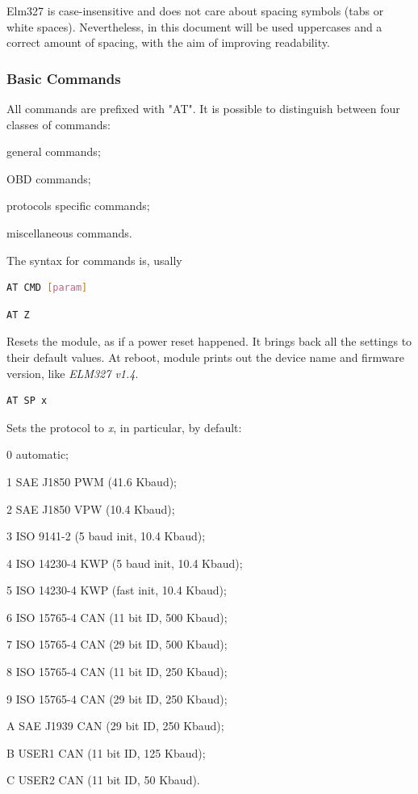 \documentclass[twoside]{article}
\begin{document}
\begin{multicols}{2}
Elm327 is case-insensitive and does not care about spacing symbols (tabs or white spaces).
Nevertheless, in this document will be used uppercases and a correct amount of spacing, with the aim of improving readability.

\subsubsection{Basic Commands}

All commands are prefixed with "AT". It is possible to distinguish between four classes of commands:
\begin{compactitem}
  \item general commands;
  \item OBD commands;
  \item protocols specific commands;
  \item miscellaneous commands.
\end{compactitem}

The syntax for commands is, usally
\begin{lstlisting}[language=bash]
AT CMD [param]
\end{lstlisting}

\begin{lstlisting}[language=bash]
AT Z
\end{lstlisting}

Resets the module, as if a power reset happened.
It brings back all the settings to their default values.
At reboot, module prints out the device name and firmware version, like \emph{ELM327 v1.4}.

\begin{lstlisting}[language=bash]
AT SP x
\end{lstlisting}

Sets the protocol to \emph{x}, in particular, by default:
\begin{compactitem}
  \item 0 automatic;
  \item 1 SAE J1850 PWM (41.6 Kbaud);
  \item 2 SAE J1850 VPW (10.4 Kbaud);
  \item 3 ISO 9141-2 (5 baud init, 10.4 Kbaud);
  \item 4 ISO 14230-4 KWP (5 baud init, 10.4 Kbaud);
  \item 5 ISO 14230-4 KWP (fast init, 10.4 Kbaud);
  \item 6 ISO 15765-4 CAN (11 bit ID, 500 Kbaud);
  \item 7 ISO 15765-4 CAN (29 bit ID, 500 Kbaud);
  \item 8 ISO 15765-4 CAN (11 bit ID, 250 Kbaud);
  \item 9 ISO 15765-4 CAN (29 bit ID, 250 Kbaud);
  \item A SAE J1939 CAN (29 bit ID, 250 Kbaud);
  \item B USER1 CAN (11 bit ID, 125 Kbaud);
  \item C USER2 CAN (11 bit ID, 50 Kbaud).
\end{compactitem}


\end{multicols}
\end{document}
